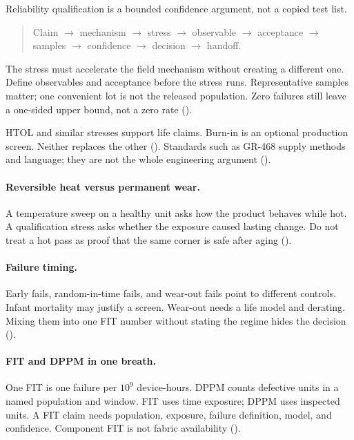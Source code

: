 Reliability qualification is a bounded confidence argument, not a copied test
list.

\begin{quote}
\noindent Claim
$\rightarrow$ mechanism
$\rightarrow$ stress
$\rightarrow$ observable
$\rightarrow$ acceptance
$\rightarrow$ samples
$\rightarrow$ confidence
$\rightarrow$ decision
$\rightarrow$ handoff.
\end{quote}

The stress must accelerate the field mechanism without creating a different
one. Define observables and acceptance before the stress runs. Representative
samples matter; one convenient lot is not the released population. Zero
failures still leave a one-sided upper bound, not a zero rate
().

HTOL and similar stresses support life claims. Burn-in is an optional
production screen. Neither replaces the other
(). Standards such as GR-468
supply methods and language; they are not the whole engineering argument
().

\paragraph{Reversible heat versus permanent wear.}
A temperature sweep on a healthy unit asks how the product behaves while hot.
A qualification stress asks whether the exposure caused lasting change. Do not
treat a hot pass as proof that the same corner is safe after aging
().

\paragraph{Failure timing.}
Early fails, random-in-time fails, and wear-out fails point to different
controls. Infant mortality may justify a screen. Wear-out needs a life model
and derating. Mixing them into one FIT number without stating the regime hides
the decision ().

\paragraph{FIT and DPPM in one breath.}
One FIT is one failure per $10^9$ device-hours. DPPM counts defective units in
a named population and window. FIT uses time exposure; DPPM uses inspected
units. A FIT claim needs population, exposure, failure definition, model, and
confidence. Component FIT is not fabric availability
().

